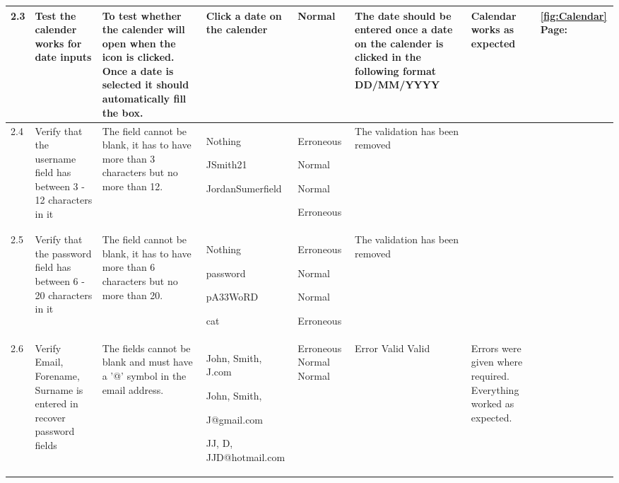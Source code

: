 \begin{landscape}
\begin{center}
\begin{longtable}{|p{1.5cm}|p{2cm}|p{2.5cm}|p{2cm}|p{2cm}|p{2cm}|p{3cm}|p{1.7cm}|}
2.3 & Test the calender works for date inputs & To test whether the calender will open when the icon is clicked. Once a date is selected it should automatically fill the box. & Click a date on the calender & Normal  & The date should be entered once a date on the calender is clicked in the following format DD/MM/YYYY &Calendar works as expected&  \ref {fig:Calendar} Page: \pageref{fig:Calendar}  \\ \hline
\rowcolor{gray}2.4 & Verify that the username field has between 3 - 12 characters in it & The field cannot be blank, it has to have more than 3 characters but no more than 12. & Nothing \par \bigskip 30597 \par \bigskip JSmith21 \par \bigskip JordanSumerfield &Erroneous \par \bigskip  Normal \par \bigskip Normal \par \bigskip Erroneous &The validation has been removed && \\ \hline
\rowcolor{gray}2.5 & Verify that the password field has between 6 - 20 characters in it & The field cannot be blank, it has to have more than 6 characters but no more than 20. & Nothing \par password \par pA33WoRD \par cat  &Erroneous \par Normal \par Normal \par Erroneous &The validation has been removed && \\ \hline
2.6 & Verify Email, Forename, Surname is entered in recover password fields & The fields cannot be blank and must have a '@' symbol in the email address. & John, Smith, J.com \par  \bigskip John, Smith, \par J@gmail.com \bigskip \par JJ, D, JJD@hotmail.com \par & Erroneous \newline  \newline \newline Normal \newline \newline \newline \newline Normal &  \par Error  \newline  \newline \newline Valid \newline \newline \newline \newline Valid&Errors were given where required. \newline \newline Everything worked as expected.& \\ \hline

\end{longtable}
\end{center}
\end{landscape}
